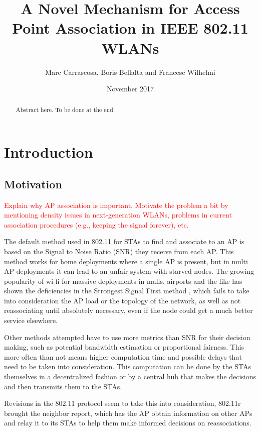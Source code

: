 \documentclass{ article}
\title{A Novel Mechanism for Access Point Association in IEEE 802.11 WLANs}
\author{Marc Carrascosa, Boris Bellalta and Francesc Wilhelmi}
\date{November 2017}
\begin{document}
\maketitle

\begin{abstract}
	Abstract here. To be done at the end.
\end{abstract}

\tableofcontents
\newpage

\section{Introduction}
\label{section:introduction}
	
	\subsection{Motivation}
	\label{section:motivation}
		\textcolor{red}{Explain why AP association is important. Motivate the problem a bit by mentioning density issues in next-generation WLANs, problems in current association procedures (e.g., keeping the signal forever), etc.}

	The default method used in 802.11 for STAs to find and associate to an AP is based on the Signal to Noise Ratio (SNR) they receive from each AP. This method works for home deployments where a single AP is present, but in multi AP deployments it can lead to an unfair system with starved nodes. The growing popularity of wi-fi for massive deployments in malls, airports and the like has shown the deficiencies in the Strongest Signal First method \cite{judd2004}\cite{anand2002}, which fails to take into consideration the AP load or the topology of the network, as well as not reassociating until absolutely necessary, even if the node could get a much better service elsewhere.
	
	Other methods attempted have to use more metrics than SNR for their decision making, such as potential bandwidth estimation \cite{vasudevan2005} or proportional fairness\cite{Li2014}. This more often than not means higher computation time and possible delays that need to be taken into consideration. This computation can be done by the STAs themselves in a decentralized fashion or by a central hub that makes the decisions and then transmits them to the STAs. 
	
	
	Revisions in the 802.11 protocol seem to take this into consideration, 802.11r brought the neighbor report, which has the AP obtain information on other APs and relay it to its STAs to help them make informed decisions on reassociations. 
	
\end{document}
